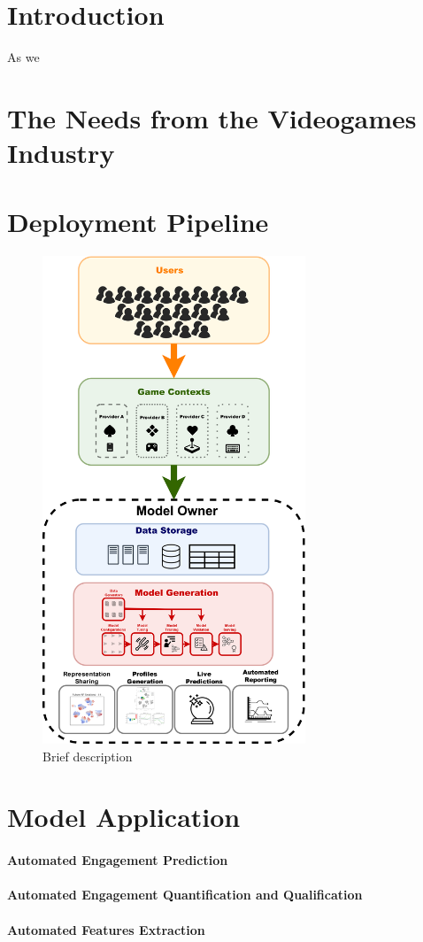 \section{Introduction}
\label{industry_needs}
As we 

\section{The Needs from the Videogames Industry}
\label{industry_needs}
\lorem

\section{Deployment Pipeline}
\label{industry_needs}
\begin{figure}[ht]
\centering
\includegraphics[width=0.7\textwidth]{images/chapter_5/pipeline.png}
\caption[\textbf{Model Deployment Pipeline}]{Brief description}
\label{pipeline}
\end{figure}


\section{Model Application}
\label{industry_needs}

\paragraph*{Automated Engagement Prediction}
\lorem

\paragraph*{Automated Engagement Quantification and Qualification}
\lorem

\paragraph*{Automated Features Extraction}
\lorem